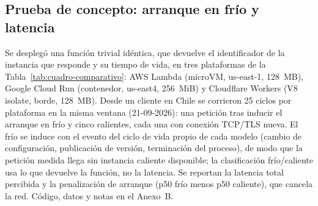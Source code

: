 
\subsection{Prueba de concepto: arranque en frío y latencia}
\label{sec:poc}

Se desplegó una función trivial idéntica, que devuelve el identificador de la
instancia que responde y su tiempo de vida, en tres plataformas de la
Tabla~\ref{tab:cuadro-comparativo}: AWS Lambda (microVM, us-east-1, 128~MB), Google
Cloud Run (contenedor, us-east4, 256~MiB) y Cloudflare Workers (V8 isolate, borde,
128~MB). Desde un cliente en Chile se corrieron 25 ciclos por plataforma en la misma
ventana (21-09-2026): una petición tras inducir el arranque en frío y cinco
calientes, cada una con conexión TCP/TLS nueva. El frío se induce con el evento del
ciclo de vida propio de cada modelo (cambio de configuración, publicación de versión,
terminación del proceso), de modo que la petición medida llega sin instancia caliente
disponible; la clasificación frío/caliente usa lo que devuelve la función, no la
latencia. Se reportan la latencia total percibida y la penalización de arranque (p50
frío menos p50 caliente), que cancela la red. Código, datos y notas en el Anexo~B.



